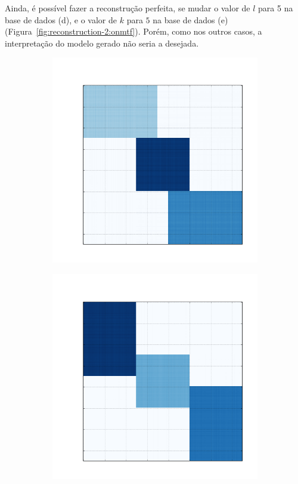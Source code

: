 \documentclass[
    12pt,                %
    oneside,            %
    a4paper,            %
    english,            %
    brazil                %
    ]{abntex2ppgsi}
\begin{document}
Ainda, é possível fazer a reconstrução perfeita, se mudar o valor de $l$ para 5 na base de dados (d), e o valor de $k$ para $5$ na base de dados (e) (Figura~\ref{fig:reconstruction-2:onmtf}).
Porém, como nos outros casos, a interpretação do modelo gerado não seria a desejada.

\begin{figure}[H]
\centering
    \caption{
        Resultado da reconstrução da base de dados (d) com $k = 5$ e (e) com $l = 5$, respectivamente, utilizando o algoritmo \textit{ONMTF}.
    }
    \begin{subfigure}[b]{0.18\textwidth}
        \includegraphics[width=\textwidth]{img/d-reconstruction-2-onmtf.png}
    \end{subfigure}
    \begin{subfigure}[b]{0.18\textwidth}
        \includegraphics[width=\textwidth]{img/e-reconstruction-2-onmtf.png}

\end{subfigure}
\end{figure}
\end{document}
